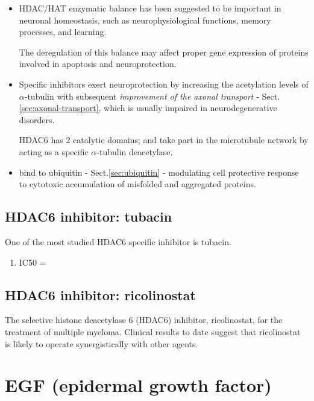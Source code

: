 \begin{itemize}

  \item 
  HDAC/HAT enzymatic balance has been suggested to be important in neuronal
  homeostasis, such as neurophysiological functions, memory processes, and
  learning.
  
  The deregulation of this balance may affect proper gene expression of
  proteins involved in apoptosis and neuroprotection.
    
  \item    Specific inhibitors exert neuroprotection by increasing the
  acetylation levels of $\alpha$-tubulin with subsequent {\it improvement of the
  axonal transport} - Sect.\ref{sec:axonal-transport}, which is usually impaired
  in neurodegenerative disorders.
  
HDAC6 has 2 catalytic domains; and  take part in the microtubule network by
acting as a specific $\alpha$-tubulin deacetylase.
  
   \item bind to ubiquitin - Sect.\ref{sec:ubiquitin} - modulating cell
   protective response to cytotoxic accumulation of misfolded and aggregated
   proteins.
   
   
     
\end{itemize}

\subsection{HDAC6 inhibitor: tubacin}
\label{sec:HDAC6-inhibitor-tubacin}

One of the most studied HDAC6 specific inhibitor is tubacin.
\begin{enumerate}
  \item IC50 = 
\end{enumerate}

\subsection{HDAC6 inhibitor: ricolinostat}
\label{sec:HDAC6-inhibitor-ricolinostat}

The selective histone deacetylase 6 (HDAC6) inhibitor, ricolinostat, for the
treatment of multiple myeloma. Clinical results to date suggest that
ricolinostat is likely to operate synergistically with other agents.

\section{EGF (epidermal growth factor)}
\label{sec:EGF}

